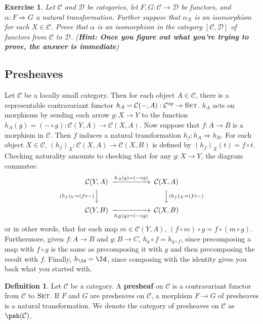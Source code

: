 \documentclass[11pt]{article}
\theoremstyle{plain}
\newtheorem{exrc}[thm]{Exercise}
\theoremstyle{definition}
\newtheorem{defn}[thm]{Definition}
\newcommand{\s}[1]{\mathcal{#1}}
\newcommand{\Set}{{\textsc{Set}}}
\begin{document}
\begin{exrc}
    Let $\s C$ and $\s D$ be categories, let $F, G : \s C \to \s D$ be functors, and $\alpha : F \Rightarrow G$ a natural transformation. Further suppose that $\alpha_X$ is an isomorphism for each $X \in \s C$. Prove that $\alpha$ is an isomorphism in the category $[\s C, \s D]$ of functors from $\s C$ to $\s D$. (\textbf{Hint: Once you figure out what you're trying to prove, the answer is immediate})
\end{exrc}

\subsection{Presheaves}

Let $\s{C}$ be a locally small category. Then for each object $A \in \s{C}$, there is a representable contravariant functor $h_A = \s{C}(-,A) : \s{C}^{op} \to \Set$. $h_A$ acts on morphisms by sending each arrow $g : X \to Y$ to the function $h_A(g) = (- \circ g) : \s{C}(Y,A) \to \s{C}(X,A)$. Now suppose that $f : A \to B$ is a morphism in $\s{C}$. Then $f$ induces a natural transformation $h_f : h_A \Rightarrow h_B$. For each object $X \in \s{C}$, $(h_f)_X : \s{C}(X,A) \to \s{C}(X,B)$ is defined by $(h_f)_X(t) = f \circ t$. Checking naturality amounts to checking that for any $g : X \to Y$, the diagram commutes:
\[
    \begin{CD}
        \s{C}(Y,A) @>h_A(g) = (-\circ g)>> \s{C}(X,A) \\
        @V(h_f)_Y=(f\circ-)VV @VV(h_f)_X = (f\circ-)V \\
        \s{C}(Y,B) @>>h_B(g) = (-\circ g)> \s{C}(X,B)
    \end{CD}
\]
or in other words, that for each map $m \in \s{C}(Y,A)$, $(f \circ m) \circ g = f \circ (m \circ g)$. Furthermore, given $f : A \to B$ and $g : B \to C$, $h_g \circ f = h_{g \circ f}$, since precomposing a map with $f \circ g$ is the same as precomposing it with $g$ and then precomposing the result with $f$. Finally, $h_{\Id} = \Id$, since composing with the identity gives you back what you started with.

\begin{defn}
    Let $\s C$ be a category. A \textbf{presheaf} on $\s C$ is a contravariant functor from $\s C$ to $\Set$. If $F$ and $G$ are presheaves on $\s C$, a morphism $F \to G$ of presheaves is a natural transformation. We denote the category of presheaves on $\s C$ as $\psh(\s C)$.
\end{defn}
\end{document}
